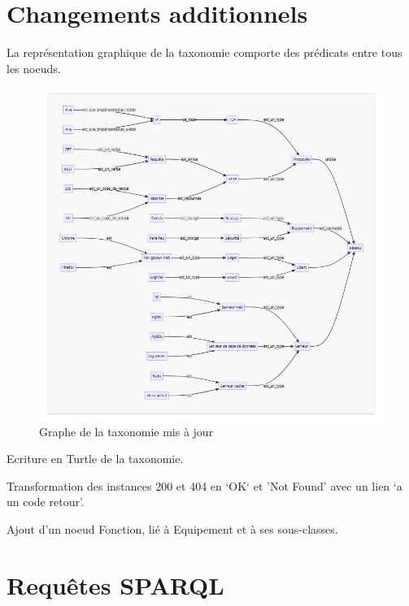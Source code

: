 \documentclass[a4paper,12pt,titlepage]{article}
\begin{document}
\newpage
\section{Changements additionnels}
La représentation graphique de la taxonomie comporte des prédicats entre tous les noeuds.
\begin{figure}[H]
    \centering
    \includegraphics[width=\textwidth, height=\textheight, keepaspectratio]{../images/mermaid_v3.png}
    \caption{Graphe de la taxonomie mis à jour}\label{fig:Graphe de la taxonomie avec tous les prédicats}
\end{figure}

Ecriture en Turtle de la taxonomie.

Transformation des instances 200 et 404 en `OK` et 'Not Found' avec un lien `a un code retour'.

Ajout d'un noeud Fonction, lié à Equipement et à ses sous-classes.

\newpage
\section{Requêtes SPARQL}


\end{document}
